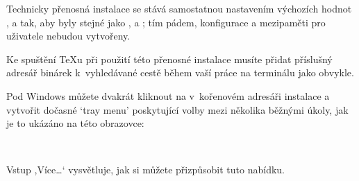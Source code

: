 \documentclass[\classoptions,slovak,english,czech]{\classname}
\newcommand{\singleuv}[1]{,#1`}
\begin{document}
Technicky přenosná instalace se stává samostatnou nastavením
výchozích hodnot ,  a
 tak, aby byly stejné jako ,
 a ; tím pádem,
konfigurace a mezipaměti pro uživatele nebudou vytvořeny. 

Ke spuštění \TeX{}u při použití této přenosné instalace musíte přidat 
příslušný adresář binárek k~vyhledávané cestě 
během vaší práce na terminálu jako obvykle. 

Pod Windows můžete dvakrát kliknout
na  v~kořenovém adresáři instalace a 
vytvořit dočasné `tray menu' poskytující volby mezi 
několika běžnými úkoly, jak je to ukázáno na této obrazovce:

\medskip
{} %
\smallskip

\noindent Vstup \singleuv{Více\ldots} vysvětluje, jak si můžete 
přizpůsobit tuto nabídku.
\end{document}
